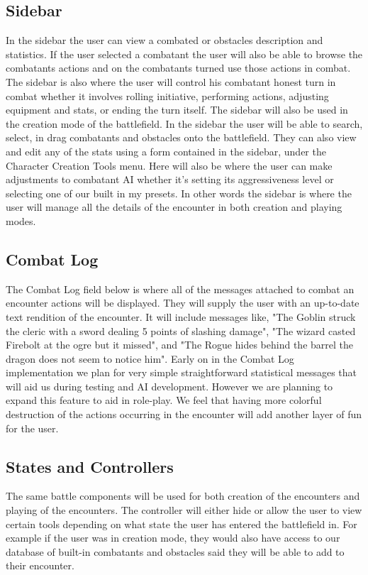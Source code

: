 \documentclass[12pt,a4paper]{report}
\begin{document}
\subsection {Sidebar}
In the sidebar the user can view a combated or obstacles description and statistics. If the user selected a combatant the user will also be able to browse the combatants actions and on the combatants turned use those actions in combat. The sidebar is also where the user will control his combatant honest turn in combat whether it involves rolling initiative, performing actions, adjusting equipment and stats, or ending the turn itself. The sidebar will also be used in the creation mode of the battlefield. In the sidebar the user will be able to search, select, in drag combatants and obstacles onto the battlefield. They can also view and edit any of the stats using a form contained in the sidebar, under the Character Creation Tools menu. Here will also be where the user can make adjustments to combatant AI whether it's setting its aggressiveness level or selecting one of our built in my presets. In other words the sidebar is where the user will manage all the details of the encounter in both creation and playing modes. 
\subsection {Combat Log}
The Combat Log field below is where all of the messages attached to combat an encounter actions will be displayed. They will supply the user with an up-to-date text rendition of the encounter. It will include messages like, "The Goblin struck the cleric with a sword dealing 5 points of slashing damage", "The wizard casted Firebolt at the ogre but it missed", and "The Rogue hides behind the barrel the dragon does not seem to notice him". Early on in the Combat Log implementation we plan for very simple straightforward statistical messages that will aid us during testing and AI development. However we are planning to expand this feature to aid in role-play. We feel that having more colorful destruction of the actions occurring in the encounter will add another layer of fun for the user. 
\subsection {States and Controllers }
The same battle components will be used for both creation of the encounters and playing of the encounters. The controller will either hide or allow the user to view certain tools depending on what state the user has entered the battlefield in. For example if the user was in creation mode, they would also have access to our database of built-in combatants and obstacles said they will be able to add to their encounter. 
\end{document}
